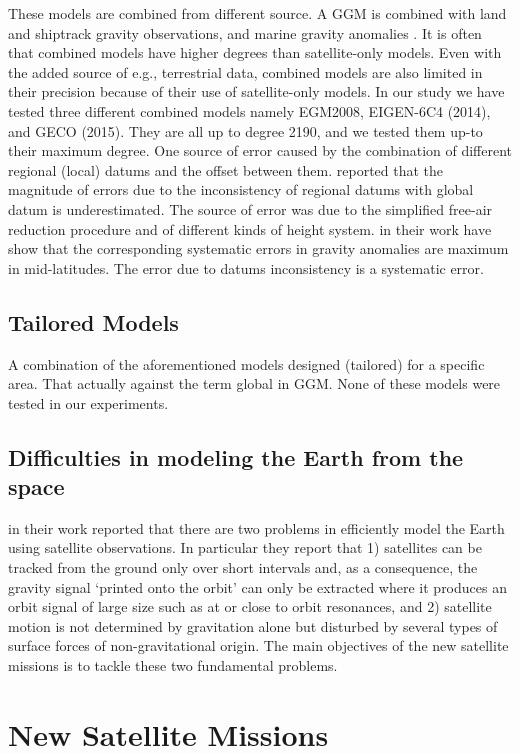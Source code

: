 These models are combined from different source. A GGM is combined with land and shiptrack
 gravity observations, and marine gravity anomalies \citet{amos}. It is often that combined models have higher degrees than satellite-only models. Even with the added source of e.g., terrestrial data, combined models are also limited in their precision because of their use of satellite-only models. In our study we have tested three different combined models namely EGM2008, EIGEN-6C4 (2014), and GECO (2015). They are all up to degree 2190, and we tested them up-to their maximum degree. One source of error caused by the combination of different regional (local) datums and the offset between them. \citet{heck} reported that the magnitude of errors due to the inconsistency of regional datums with global datum is underestimated. The source of error was due to the simplified free-air reduction procedure and of different kinds of height system. \citet{heck} in their work have show that the corresponding systematic errors in gravity anomalies are maximum in mid-latitudes. The error due to datums inconsistency is a systematic error.
 
 
 \subsection{Tailored Models}
 A combination of the aforementioned models designed (tailored) for a specific area. That actually against the term global in GGM. None of these models were tested in our experiments.
 
 
 \subsection{Difficulties in modeling the Earth from the space}\label{fundamental_satellite_problem}
 
 \citep{rummel} in their work reported that there are two problems in efficiently model the Earth using satellite observations. In particular they report that 1) satellites can be tracked from the ground only over short intervals
 and, as a consequence, the gravity signal ‘printed onto the orbit’ can only be extracted where
 it produces an orbit signal of large size such as at or close to orbit resonances, and 2) satellite motion is not determined by gravitation alone but disturbed by several types of surface forces of non-gravitational origin. The main objectives of the new satellite missions is to tackle these two fundamental problems.
 \section{New Satellite Missions}
 
